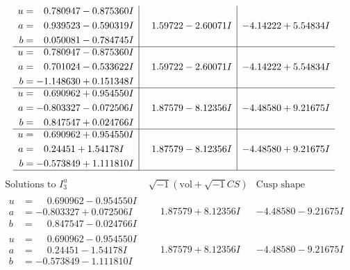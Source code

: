 \documentclass[1p]{elsarticle_modified}
\theoremstyle{definition}
\newcommand{\I}{\sqrt{-1}}
\begin{document}
$$\begin{array}{c|c|c}
\begin{aligned}
u &= \phantom{-}0.780947 - 0.875360 I \\
a &= \phantom{-}0.939523 - 0.590319 I \\
b &= \phantom{-}0.050081 - 0.784745 I\end{aligned}
 & \phantom{-}1.59722 - 2.60071 I & -4.14222 + 5.54834 I \\ \hline\begin{aligned}
u &= \phantom{-}0.780947 - 0.875360 I \\
a &= \phantom{-}0.701024 - 0.533622 I \\
b &= -1.148630 + 0.151348 I\end{aligned}
 & \phantom{-}1.59722 - 2.60071 I & -4.14222 + 5.54834 I \\ \hline\begin{aligned}
u &= \phantom{-}0.690962 + 0.954550 I \\
a &= -0.803327 - 0.072506 I \\
b &= \phantom{-}0.847547 + 0.024766 I\end{aligned}
 & \phantom{-}1.87579 - 8.12356 I & -4.48580 + 9.21675 I \\ \hline\begin{aligned}
u &= \phantom{-}0.690962 + 0.954550 I \\
a &= \phantom{-}0.24451 + 1.54178 I \\
b &= -0.573849 + 1.111810 I\end{aligned}
 & \phantom{-}1.87579 - 8.12356 I & -4.48580 + 9.21675 I\\
 \hline 
 \end{array}$$\newpage$$\begin{array}{c|c|c}  
\text{Solutions to }I^u_{3}& \I (\text{vol} + \sqrt{-1}CS) & \text{Cusp shape}\\
 \hline 
\begin{aligned}
u &= \phantom{-}0.690962 - 0.954550 I \\
a &= -0.803327 + 0.072506 I \\
b &= \phantom{-}0.847547 - 0.024766 I\end{aligned}
 & \phantom{-}1.87579 + 8.12356 I & -4.48580 - 9.21675 I \\ \hline\begin{aligned}
u &= \phantom{-}0.690962 - 0.954550 I \\
a &= \phantom{-}0.24451 - 1.54178 I \\
b &= -0.573849 - 1.111810 I\end{aligned}
 & \phantom{-}1.87579 + 8.12356 I & -4.48580 - 9.21675 I \\ \hline\begin{aligned}

\end{aligned}
\end{array}$$
\end{document}
